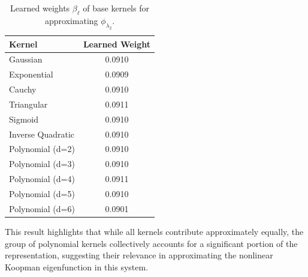 \documentclass[11pt]{article}
\theoremstyle{plain}
\begin{document}
\begin{table}[h!]
\centering
\begin{tabular}{|l|c|}
\hline
\textbf{Kernel} & \textbf{Learned Weight} \\
\hline
Gaussian            & 0.0910 \\
Exponential         & 0.0909 \\
Cauchy              & 0.0910 \\
Triangular          & 0.0911 \\
Sigmoid             & 0.0910 \\
Inverse Quadratic   & 0.0910 \\
Polynomial (d=2)    & 0.0910 \\
Polynomial (d=3)    & 0.0910 \\
Polynomial (d=4)    & 0.0911 \\
Polynomial (d=5)    & 0.0910 \\
Polynomial (d=6)    & 0.0901 \\
\hline
\end{tabular}
\caption{Learned weights $\beta_\ell$ of base kernels for approximating $\phi_{\lambda_2}$.}
\end{table}

This result highlights that while all kernels contribute approximately equally, the group of polynomial kernels collectively accounts for a significant portion of the representation, suggesting their relevance in approximating the nonlinear Koopman eigenfunction in this system.

\end{document}
